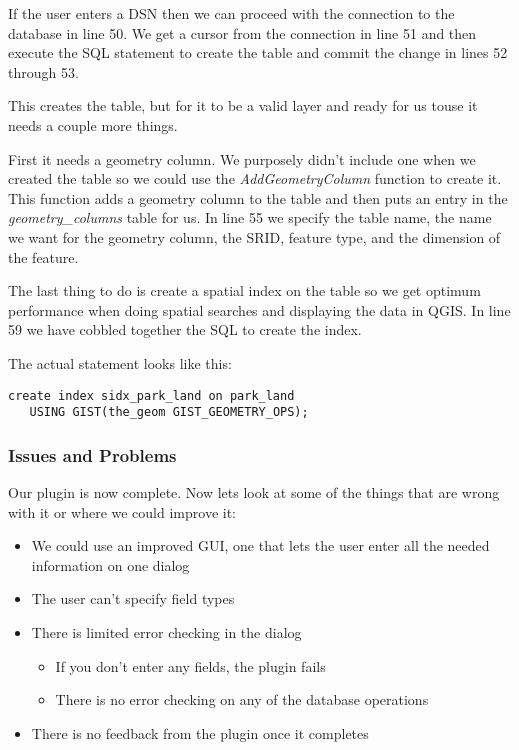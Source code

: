 If the user enters a DSN then we can proceed with the connection to the database in line 50.
We get a cursor from the connection in line 51 and then execute the SQL statement to create the table and commit the change in lines 52 through 53.

This creates the table, but for it to be a valid layer and ready for us touse it needs a couple more things.

First it needs a geometry column.
We purposely didn't include one when we created the table so we could use the \textsl{AddGeometryColumn} function to create it. This function adds a geometry column to the table and then puts an entry in the \textsl{geometry\_columns} table for us.
In line 55 we specify the table name, the name we want for the geometry column, the SRID, feature type, and the dimension of the feature.

The last thing to do is create a spatial index on the table so we get optimum performance when doing spatial searches and displaying the data in QGIS.
In line 59 we have cobbled together the SQL to create the index.

The actual statement looks like this:

\begin{verbatim}
create index sidx_park_land on park_land 
   USING GIST(the_geom GIST_GEOMETRY_OPS);
\end{verbatim}

\subsubsection{Issues and Problems}

Our plugin is now complete.
Now lets look at some of the things that are wrong with it or where we could improve it:

\begin{itemize}
\item We could use an improved GUI, one that lets the user enter all the needed information on one dialog
\item The user can't specify field types
\item There is limited error checking in the dialog
  \begin{itemize}
    \item If you don't enter any fields, the plugin fails
    \item There is no error checking on any of the database operations
  \end{itemize} 
\item There is no feedback from the plugin once it completes
\end{itemize} 

